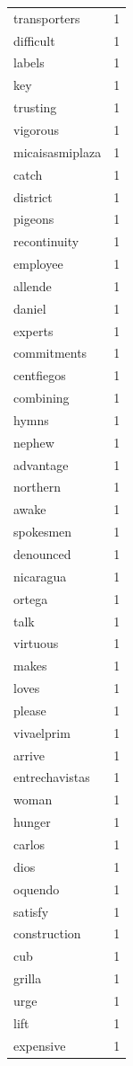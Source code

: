 \begin{tabular}{lr}
transporters & 1 \\
difficult & 1 \\
labels & 1 \\
key & 1 \\
trusting & 1 \\
vigorous & 1 \\
micaisasmiplaza & 1 \\
catch & 1 \\
district & 1 \\
pigeons & 1 \\
recontinuity & 1 \\
employee & 1 \\
allende & 1 \\
daniel & 1 \\
experts & 1 \\
commitments & 1 \\
centfiegos & 1 \\
combining & 1 \\
hymns & 1 \\
nephew & 1 \\
advantage & 1 \\
northern & 1 \\
awake & 1 \\
spokesmen & 1 \\
denounced & 1 \\
nicaragua & 1 \\
ortega & 1 \\
talk & 1 \\
virtuous & 1 \\
makes & 1 \\
loves & 1 \\
please & 1 \\
vivaelprim & 1 \\
arrive & 1 \\
entrechavistas & 1 \\
woman & 1 \\
hunger & 1 \\
carlos & 1 \\
dios & 1 \\
oquendo & 1 \\
satisfy & 1 \\
construction & 1 \\
cub & 1 \\
grilla & 1 \\
urge & 1 \\
lift & 1 \\
expensive & 1 \\

\end{tabular}
